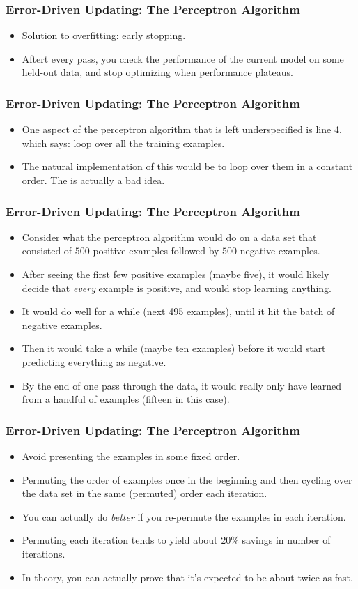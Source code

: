 \documentclass[trans]{beamer}
\begin{document}
\begin{frame}
  \frametitle{Error-Driven Updating: The Perceptron Algorithm}
\begin{itemize}
\item
Solution to overfitting: early stopping.  
\item Aftert every pass, you check the
performance of the current model on some held-out data, and stop
optimizing when performance plateaus.
\end{itemize}
\end{frame}
\begin{frame}
  \frametitle{Error-Driven Updating: The Perceptron Algorithm}
\begin{itemize}
\item
One aspect of the perceptron algorithm that is left underspecified is
line 4, which says: loop over all the training examples. 
\item  The natural
implementation of this would be to loop over them in a constant
order.  The is actually a bad idea.
\end{itemize}
\end{frame}

\begin{frame}
  \frametitle{Error-Driven Updating: The Perceptron Algorithm}
\begin{itemize}
\item
Consider what the perceptron algorithm would do on a data set that
consisted of $500$ positive examples followed by $500$ negative
examples.
\item  After seeing the first few positive examples (maybe five),
it would likely decide that \emph{every} example is positive, and
would stop learning anything. 
\item  It would do well for a while (next 495
examples), until it hit the batch of negative examples. 
\item  Then it would
take a while (maybe ten examples) before it would start predicting
everything as negative. 
\item  By the end of one pass through the data, it
would really only have learned from a handful of examples (fifteen in
this case).
\end{itemize}
\end{frame}

\begin{frame}
  \frametitle{Error-Driven Updating: The Perceptron Algorithm}
\begin{itemize}
\item
Avoid presenting the examples in some
fixed order. 
\item Permuting the order
of examples once in the beginning and then cycling over the data set
in the same (permuted) order each iteration. 
\item You can actually do \emph{better} if you re-permute the examples
in each iteration.  
\item Permuting each
iteration tends to yield about $20\%$ savings in number of iterations.
\item In theory, you can actually prove that it's expected to be about twice
as fast.
\end{itemize}
\end{frame}
\end{document}
